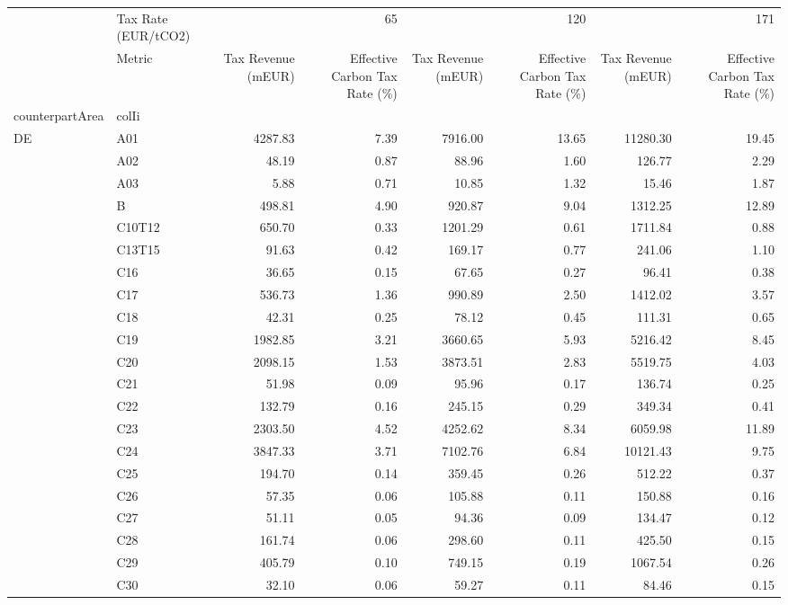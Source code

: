 \begin{tabular}{llrrrrrr}
\toprule
 & Tax Rate (EUR/tCO2) & \multicolumn{2}{r}{65} & \multicolumn{2}{r}{120} & \multicolumn{2}{r}{171} \\
 & Metric & Tax Revenue (mEUR) & Effective Carbon Tax Rate (\%) & Tax Revenue (mEUR) & Effective Carbon Tax Rate (\%) & Tax Revenue (mEUR) & Effective Carbon Tax Rate (\%) \\
counterpartArea & colIi &  &  &  &  &  &  \\
\midrule
\multirow[t]{64}{*}{DE} & A01 & 4287.83 & 7.39 & 7916.00 & 13.65 & 11280.30 & 19.45 \\
 & A02 & 48.19 & 0.87 & 88.96 & 1.60 & 126.77 & 2.29 \\
 & A03 & 5.88 & 0.71 & 10.85 & 1.32 & 15.46 & 1.87 \\
 & B & 498.81 & 4.90 & 920.87 & 9.04 & 1312.25 & 12.89 \\
 & C10T12 & 650.70 & 0.33 & 1201.29 & 0.61 & 1711.84 & 0.88 \\
 & C13T15 & 91.63 & 0.42 & 169.17 & 0.77 & 241.06 & 1.10 \\
 & C16 & 36.65 & 0.15 & 67.65 & 0.27 & 96.41 & 0.38 \\
 & C17 & 536.73 & 1.36 & 990.89 & 2.50 & 1412.02 & 3.57 \\
 & C18 & 42.31 & 0.25 & 78.12 & 0.45 & 111.31 & 0.65 \\
 & C19 & 1982.85 & 3.21 & 3660.65 & 5.93 & 5216.42 & 8.45 \\
 & C20 & 2098.15 & 1.53 & 3873.51 & 2.83 & 5519.75 & 4.03 \\
 & C21 & 51.98 & 0.09 & 95.96 & 0.17 & 136.74 & 0.25 \\
 & C22 & 132.79 & 0.16 & 245.15 & 0.29 & 349.34 & 0.41 \\
 & C23 & 2303.50 & 4.52 & 4252.62 & 8.34 & 6059.98 & 11.89 \\
 & C24 & 3847.33 & 3.71 & 7102.76 & 6.84 & 10121.43 & 9.75 \\
 & C25 & 194.70 & 0.14 & 359.45 & 0.26 & 512.22 & 0.37 \\
 & C26 & 57.35 & 0.06 & 105.88 & 0.11 & 150.88 & 0.16 \\
 & C27 & 51.11 & 0.05 & 94.36 & 0.09 & 134.47 & 0.12 \\
 & C28 & 161.74 & 0.06 & 298.60 & 0.11 & 425.50 & 0.15 \\
 & C29 & 405.79 & 0.10 & 749.15 & 0.19 & 1067.54 & 0.26 \\
 & C30 & 32.10 & 0.06 & 59.27 & 0.11 & 84.46 & 0.15 \\

\end{tabular}
